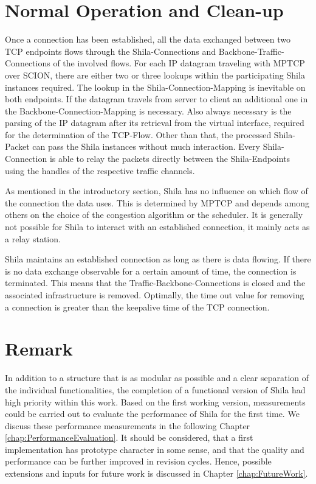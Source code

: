 \section{Normal Operation and Clean-up}
\label{sec:ImplementationNormalOperationAndCleanUp}

Once a connection has been established, all the data exchanged between two TCP endpoints flows through the Shila-Connections and Backbone-Traffic-Connections of the involved flows. For each IP datagram traveling with MPTCP over SCION, there are either two or three lookups within the participating Shila instances required. The lookup in the Shila-Connection-Mapping is inevitable on both endpoints. If the datagram travels from server to client an additional one in the Backbone-Connection-Mapping is necessary. Also always necessary is the parsing of the IP datagram after its retrieval from the virtual interface, required for the determination of the TCP-Flow. Other than that, the processed Shila-Packet can pass the Shila instances without much interaction. Every Shila-Connection is able to relay the packets directly between the Shila-Endpoints using the handles of the respective traffic channels.

As mentioned in the introductory section, Shila has no influence on which flow of the connection the data uses. This is determined by MPTCP and depends among others on the choice of the congestion algorithm or the scheduler. It is generally not possible for Shila to interact with an established connection, it mainly acts as a relay station.

Shila maintains an established connection as long as there is data flowing. If there is no data exchange observable for a certain amount of time, the connection is terminated. This means that the Traffic-Backbone-Connections is closed and the associated infrastructure is removed. Optimally, the time out value for removing a connection is greater than the keepalive time \cite{KeepaliveWiki} of the TCP connection.

\section{Remark}

In addition to a structure that is as modular as possible and a clear separation of the individual functionalities, the completion of a functional version of Shila had high priority within this work. Based on the first working version, measurements could be carried out to evaluate the performance of Shila for the first time. We discuss these performance measurements in the following Chapter \ref{chap:PerformanceEvaluation}. It should be considered, that a first implementation has prototype character in some sense, and that the quality and performance can be further improved in revision cycles. Hence, possible extensions and inputs for future work is discussed in Chapter \ref{chap:FutureWork}.